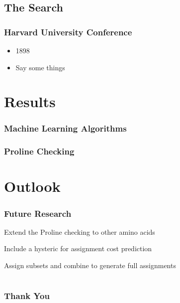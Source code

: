 \documentclass{beamer}
\begin{document}
\subsection{The Search} 
\begin{frame}
	\frametitle{Harvard University Conference}
	\begin{itemize}
		\item 1898
		\item Say some things
	\end{itemize}
\end{frame}

\section{Results}
\begin{frame}
	\frametitle{Machine Learning Algorithms}
	\resizebox{!}{0.6\textwidth}{}
\end{frame}

\begin{frame}
	\frametitle{Proline Checking}
	\resizebox{!}{0.6\textwidth}{}
\end{frame}

\section{Outlook}
\begin{frame}
	\frametitle{Future Research}
	\begin{block}{Extend the Proline checking to other amino acids}
	\end{block}

	\begin{block}{Include a hysteric for assignment cost prediction}
	\end{block}

	\begin{block}{Assign subsets and combine to generate full assignments}
	\end{block}
\end{frame}

\section{}
\begin{frame}
	\frametitle{Thank You} 
	\begin{center}
		
	\end{center}
\end{frame}
\end{document}

